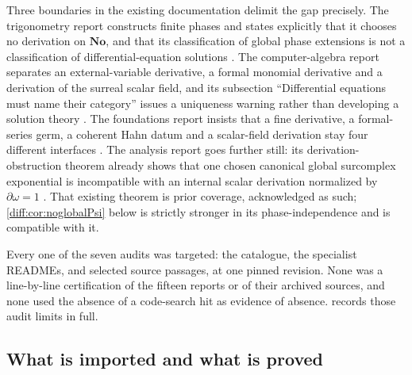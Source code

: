 \documentclass[11pt,letterpaper]{article}
\numberwithin{equation}{section}
\theoremstyle{definition}
\theoremstyle{remark}
\newcommand{\No}{\mathbf{No}}
\newcommand{\der}{\partial}
\begin{document}
Three boundaries in the existing documentation delimit the gap precisely.
The trigonometry report constructs finite phases and states explicitly that it
chooses no derivation on $\No$, and that its classification of global phase
extensions is not a classification of differential-equation solutions
\cite{RepoTrig}. The computer-algebra report separates an external-variable
derivative, a formal monomial derivative and a derivation of the surreal
scalar field, and its subsection ``Differential equations must name their
category'' issues a uniqueness warning rather than developing a solution
theory \cite{RepoCAS}. The foundations report insists that a fine derivative,
a formal-series germ, a coherent Hahn datum and a scalar-field derivation stay
four different interfaces \cite{RepoFound}. The analysis report goes further
still: its derivation-obstruction theorem already shows that one chosen
canonical global surcomplex exponential is incompatible with an internal scalar
derivation normalized by $\der\omega=1$ \cite{RepoAnalysis}. That existing
theorem is prior coverage, acknowledged as such; \cref{diff:cor:noglobalPsi}
below is strictly stronger in its phase-independence and is compatible with it.

Every one of the seven audits was targeted: the catalogue, the specialist
READMEs, and selected source passages, at one pinned revision. None was a
line-by-line certification of the fifteen reports or of their archived
sources, and none used the absence of a code-search hit as evidence of
absence.  records those audit limits in full.

\subsection{What is imported and what is proved}
\label{diff:sub:imported}
\end{document}
